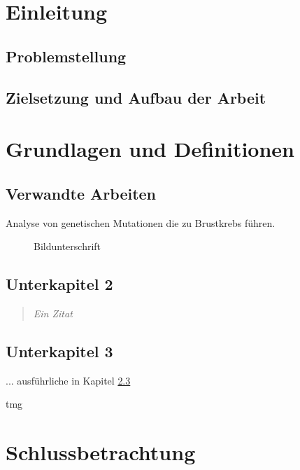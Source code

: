 




		

		
\chapter{Einleitung}
	
\section{Problemstellung}
	
		
	\section{Zielsetzung und Aufbau der Arbeit}
		 
		
		
\chapter{Grundlagen und Definitionen}
	
	
	\section{Verwandte Arbeiten}
	Analyse von genetischen Mutationen die zu Brustkrebs führen.	
	\cite{breastcancer}
	
		\begin{figure}[htbp]
			\centering
			\caption[xxx]{Bildunterschrift}
			\label{xxx}
		\end{figure}
		
			
	\section{Unterkapitel 2}
		
		\begin{quote}
			\textit{Ein Zitat}
		\end{quote}

	\section{Unterkapitel 3}	\label{Kapitel_xxx} %
		... ausführliche in Kapitel \ref{Kapitel_xxx}

				\autocite[20]{}
				
	\gls{tmg}

\chapter{Schlussbetrachtung}


\newpage






